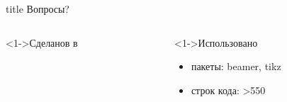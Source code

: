 \documentclass[pdf,9pt,aspectratio=169,xcolor={dvipsnames}]{beamer}
\begin{document}
\begin{frame}{}
  \vfill
  \begin{beamercolorbox}[sep=8pt,center,shadow=true,rounded=true]{title}
    Вопросы?
  \end{beamercolorbox}
  \vfill
  \begin{columns}[T]
    \begin{column}[]{0.45\textwidth}  
      \begin{exampleblock}<1->{Сделанов в}
        \begin{center}
           \Huge\LaTeXe
        \end{center}
      \end{exampleblock}
    \end{column}
    \begin{column}[]{0.45\textwidth}  
      \begin{block}<1->{Использовано}
        \begin{itemize}
          \item пакеты: beamer, tikz
          \item строк кода: >550 
        \end{itemize}
      \end{block}
    \end{column}
  \end{columns}
  \vfill
\end{frame}
\end{document}
